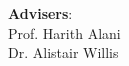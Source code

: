 \begin{titlepage}
\begin{center}
        \textbf{Advisers}:\\
        Prof. Harith Alani\\
        Dr. Alistair Willis







        \vspace{1.5cm}

        \large
        \thedate

    \end{center}
\end{titlepage}
